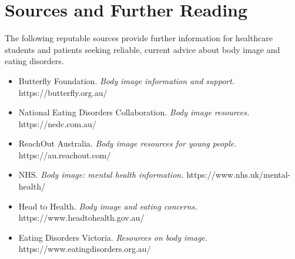 \section*{Sources and Further Reading}
The following reputable sources provide further information for healthcare students and patients seeking reliable, current advice about body image and eating disorders.
\begin{itemize}
    \item Butterfly Foundation. \textit{Body image information and support.} https://butterfly.org.au/
    \item National Eating Disorders Collaboration. \textit{Body image resources.} https://nedc.com.au/
    \item ReachOut Australia. \textit{Body image resources for young people.} https://au.reachout.com/
    \item NHS. \textit{Body image: mental health information.} https://www.nhs.uk/mental-health/
    \item Head to Health. \textit{Body image and eating concerns.} https://www.headtohealth.gov.au/
    \item Eating Disorders Victoria. \textit{Resources on body image.} https://www.eatingdisorders.org.au/
\end{itemize}
